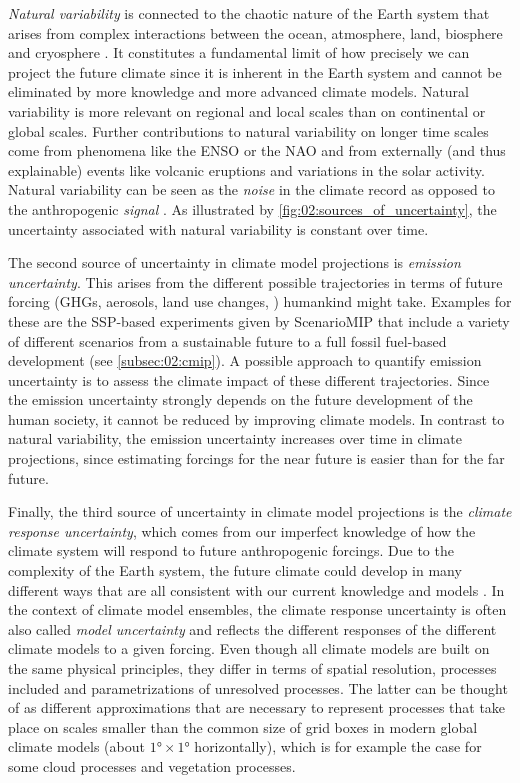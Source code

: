 \emph{Natural variability} is connected to the chaotic nature of the Earth
system that arises from complex interactions between the ocean, atmosphere,
land, biosphere and cryosphere \autocite{Cubasch2013}. It constitutes a
fundamental limit of how precisely we can project the future climate since it
is inherent in the Earth system and cannot be eliminated by more knowledge and
more advanced climate models. Natural variability is more relevant on regional
and local scales than on continental or global scales. Further contributions to
natural variability on longer time scales come from phenomena like the
\ac{ENSO} or the \ac{NAO} and from externally (and thus explainable) events
like volcanic eruptions and variations in the solar activity. Natural
variability can be seen as the \emph{noise} in the climate record as opposed to
the anthropogenic \emph{signal} \autocite{Cubasch2013}. As illustrated by
\cref{fig:02:sources_of_uncertainty}, the uncertainty associated with natural
variability is constant over time.

The second source of uncertainty in climate model projections is \emph{emission
  uncertainty}. This arises from the different possible trajectories in terms
of future forcing (\acp{GHG}, aerosols, land use changes, \etc{}) humankind
might take. Examples for these are the \ac{SSP}-based experiments given by
\ac{ScenarioMIP} that include a variety of different scenarios from a
sustainable future to a full fossil fuel-based development (see
\cref{subsec:02:cmip}). A possible approach to quantify emission uncertainty is
to assess the climate impact of these different trajectories. Since the
emission uncertainty strongly depends on the future development of the human
society, it cannot be reduced by improving climate models. In contrast to
natural variability, the emission uncertainty increases over time in climate
projections, since estimating forcings for the near future is easier than for
the far future.

Finally, the third source of uncertainty in climate model projections is the
\emph{climate response uncertainty}, which comes from our imperfect knowledge
of how the climate system will respond to future anthropogenic forcings. Due to
the complexity of the Earth system, the future climate could develop in many
different ways that are all consistent with our current knowledge and models
\autocite{Cubasch2013}. In the context of climate model ensembles, the climate
response uncertainty is often also called \emph{model uncertainty} and reflects
the different responses of the different climate models to a given forcing.
Even though all climate models are built on the same physical principles, they
differ in terms of spatial resolution, processes included and parametrizations
of unresolved processes. The latter can be thought of as different
approximations that are necessary to represent processes that take place on
scales smaller than the common size of grid boxes in modern global climate
models (about $\ang{1} \times \ang{1}$ horizontally), which is for example the
case for some cloud processes and vegetation processes.

